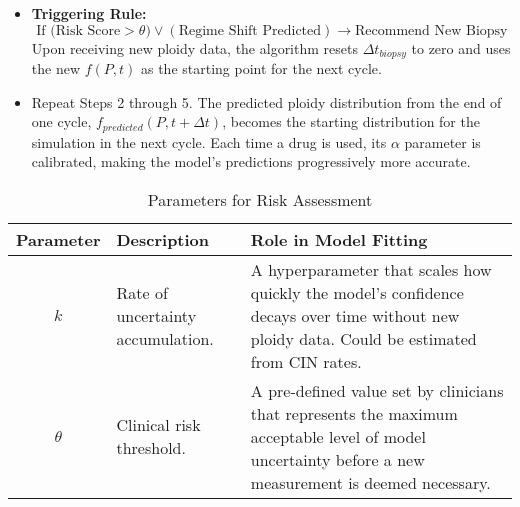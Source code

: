 \documentclass{article}
\begin{document}
\begin{itemize}
        \item \textbf{Triggering Rule:}
        $$ \text{If (Risk Score} > \theta) \lor (\text{Regime Shift Predicted}) \rightarrow \text{Recommend New Biopsy} $$
        Upon receiving new ploidy data, the algorithm resets $\Delta t_{biopsy}$ to zero and uses the new $f(P,t)$ as the starting point for the next cycle.
    \end{itemize}
    
    
    \begin{itemize}
        \item Repeat Steps 2 through 5. The predicted ploidy distribution from the end of one cycle, $f_{predicted}(P, t+\Delta t)$, becomes the starting distribution for the simulation in the next cycle. Each time a drug is used, its $\alpha$ parameter is calibrated, making the model's predictions progressively more accurate.
    \end{itemize}


\begin{table}[h!]
\centering
\caption{\color{blue} Parameters for Risk Assessment}
\label{tab:risk_parameters}
\begin{tabular}{|c|p{5cm}|p{6cm}|}
\hline
\textbf{Parameter} & \textbf{Description} & \textbf{Role in Model Fitting} \\
\hline
$k$ & Rate of uncertainty accumulation. & A hyperparameter that scales how quickly the model's confidence decays over time without new ploidy data. Could be estimated from CIN rates. \\
\hline
$\theta$ & Clinical risk threshold. & A pre-defined value set by clinicians that represents the maximum acceptable level of model uncertainty before a new measurement is deemed necessary. \\
\hline
\end{tabular}
\end{table}
\end{document}
